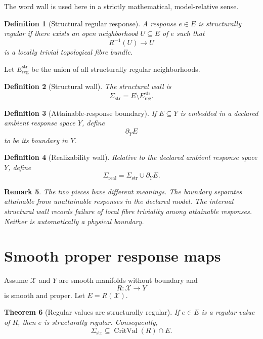 \documentclass[11pt]{article}
\newtheorem{definition}{Definition}[section]
\newtheorem{theorem}[definition]{Theorem}
\newtheorem{remark}[definition]{Remark}
\newcommand{\X}{\mathcal X}
\begin{document}
The word wall is used here in a strictly mathematical, model-relative sense.

\begin{definition}[Structural regular response]
A response \(e\in E\) is structurally regular if there exists an open
neighborhood \(U\subseteq E\) of \(e\) such that
\[
R^{-1}(U)\to U
\]
is a locally trivial topological fibre bundle.
\end{definition}

Let \(E_{\mathrm{reg}}^{\mathrm{str}}\) be the union of all structurally regular
neighborhoods.

\begin{definition}[Structural wall]
The structural wall is
\[
\Sigma_{\mathrm{str}}
=
E\setminus E_{\mathrm{reg}}^{\mathrm{str}}.
\]
\end{definition}

\begin{definition}[Attainable-response boundary]
If \(E\subseteq Y\) is embedded in a declared ambient response space \(Y\),
define
\[
\partial_YE
\]
to be its boundary in \(Y\).
\end{definition}

\begin{definition}[Realizability wall]
Relative to the declared ambient response space \(Y\), define
\[
\Sigma_{\mathrm{real}}
=
\Sigma_{\mathrm{str}}\cup\partial_YE.
\]
\end{definition}

\begin{remark}
The two pieces have different meanings. The boundary separates attainable
from unattainable responses in the declared model. The internal structural
wall records failure of local fibre triviality among attainable responses.
Neither is automatically a physical boundary.
\end{remark}

\section{Smooth proper response maps}

Assume \(\X\) and \(Y\) are smooth manifolds without boundary and
\[
R:\X\to Y
\]
is smooth and proper. Let \(E=R(\X)\).

\begin{theorem}[Regular values are structurally regular]
If \(e\in E\) is a regular value of \(R\), then \(e\) is structurally regular.
Consequently,
\[
\Sigma_{\mathrm{str}}
\subseteq
\operatorname{CritVal}(R)\cap E.
\]
\end{theorem}
\end{document}
